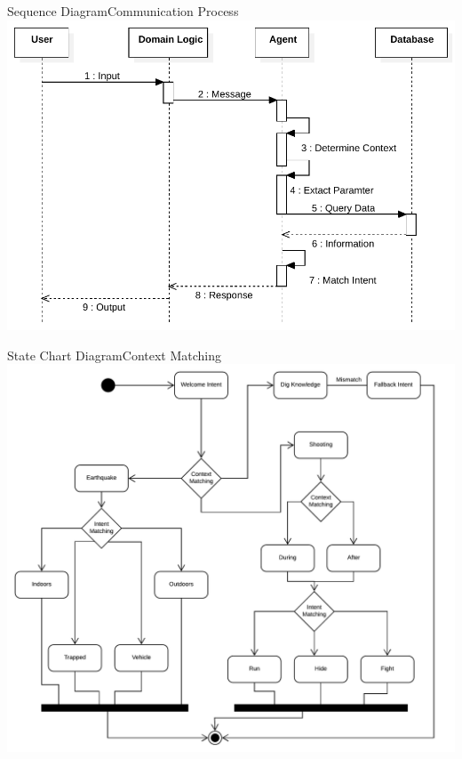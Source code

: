 \documentclass{beamer}
\begin{document}
\begin{frame}{Sequence Diagram}{Communication Process}
    \includegraphics[width=\linewidth]{imgs/SequenceDiagram1.pdf}
\end{frame}

\begin{frame}{State Chart Diagram}{Context Matching}
    \includegraphics[width=.92\linewidth]{img3/state1.pdf}
\end{frame}
\end{document}
